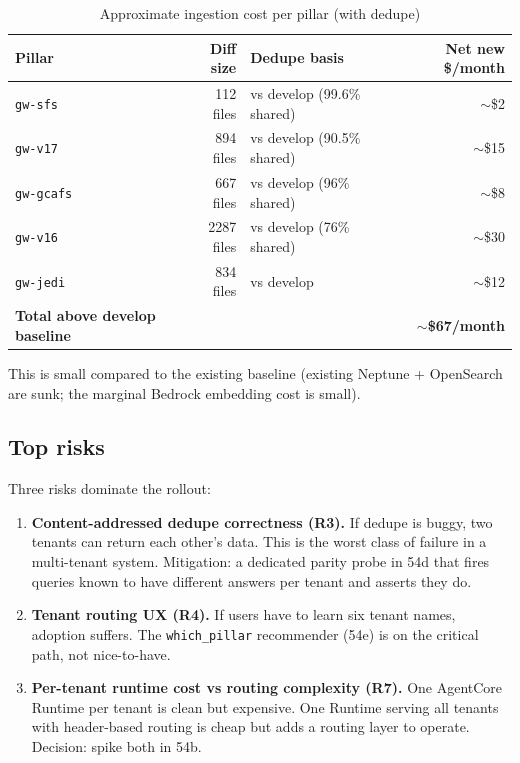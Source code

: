 \documentclass[11pt,letterpaper]{article}
\begin{document}
\begin{table}[H]
\centering
\caption{Approximate ingestion cost per pillar (with dedupe)}
\small
\begin{tabularx}{\textwidth}{lrXr}
\toprule
\textbf{Pillar} & \textbf{Diff size} & \textbf{Dedupe basis} & \textbf{Net new \$/month} \\
\midrule
\texttt{gw-sfs} & 112 files & vs develop (99.6\% shared) & $\sim$\$2 \\
\texttt{gw-v17} & 894 files & vs develop (90.5\% shared) & $\sim$\$15 \\
\texttt{gw-gcafs} & 667 files & vs develop (96\% shared) & $\sim$\$8 \\
\texttt{gw-v16} & 2287 files & vs develop (76\% shared) & $\sim$\$30 \\
\texttt{gw-jedi} & 834 files & vs develop & $\sim$\$12 \\
\midrule
\textbf{Total above develop baseline} & & & \textbf{$\sim$\$67/month} \\
\bottomrule
\end{tabularx}
\end{table}

This is small compared to the existing baseline (existing Neptune +
OpenSearch are sunk; the marginal Bedrock embedding cost is small).

\subsection{Top risks}

Three risks dominate the rollout:

\begin{enumerate}[leftmargin=*]
    \item \textbf{Content-addressed dedupe correctness (R3).} If
    dedupe is buggy, two tenants can return each other's data. This is
    the worst class of failure in a multi-tenant system. Mitigation: a
    dedicated parity probe in 54d that fires queries known to have
    different answers per tenant and asserts they do.
    \item \textbf{Tenant routing UX (R4).} If users have to learn six
    tenant names, adoption suffers. The \texttt{which\_pillar}
    recommender (54e) is on the critical path, not nice-to-have.
    \item \textbf{Per-tenant runtime cost vs routing complexity (R7).}
    One AgentCore Runtime per tenant is clean but expensive. One
    Runtime serving all tenants with header-based routing is cheap but
    adds a routing layer to operate. Decision: spike both in 54b.
\end{enumerate}
\end{document}

